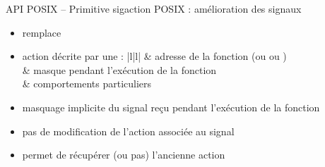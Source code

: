 \begin {frame} {API POSIX -- Primitive sigaction}
    POSIX : amélioration des signaux


    \begin {itemize}
	\item {} remplace 
	\item action décrite par une  :
	    \ctableau {\fC} {|l|l|} {
		    & adresse de la fonction (ou  ou
			)
		    \\
		    & masque pendant l'exécution de la fonction
		    \\
		    & comportements particuliers
		    \\
	    }

	    \vspace* {1mm}

	\item masquage implicite du signal reçu pendant l'exécution
	    de la fonction
	\item pas de modification de l'action associée au signal
	\item permet de récupérer (ou pas) l'ancienne action
    \end {itemize}
\end {frame}


